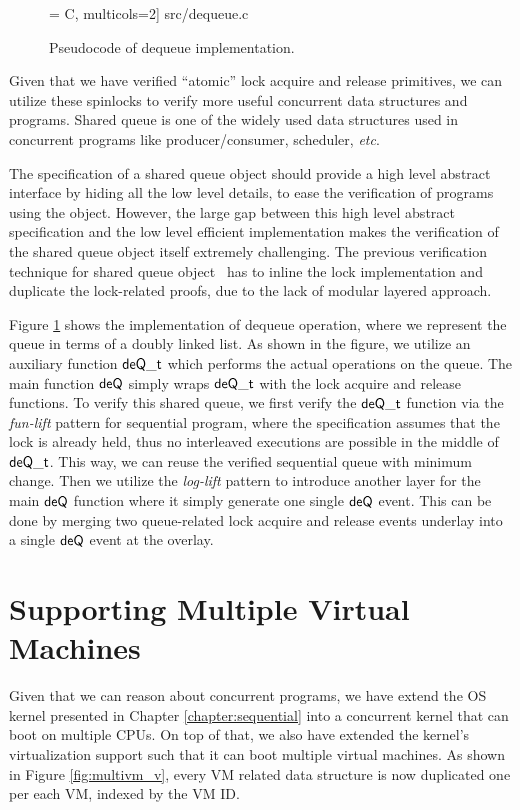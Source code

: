 \begin{figure}[t]
 = C, multicols=2] {src/dequeue.c}
\caption{Pseudocode of dequeue implementation.}
\label{fig:exp:dequeue}
\end{figure}

Given that we have verified ``atomic'' lock acquire and release primitives,
we can utilize these spinlocks to verify more useful concurrent
data structures and programs. Shared queue is one of the widely used
data structures used in concurrent programs like producer/consumer,
scheduler, {\it etc}. 

The specification of a shared queue object should provide a high level abstract
interface by hiding all the low level details,
to ease the verification of programs using the object.
However, the large gap between this high level abstract specification
and the low level efficient implementation makes the verification of the shared queue object
itself extremely challenging.
The previous verification technique for shared queue object~\cite{lili16}
has to inline the lock implementation and duplicate the lock-related proofs, due
to the lack of modular layered approach.

Figure \ref{fig:exp:dequeue} shows the implementation of dequeue operation, where
we represent the queue in terms of a doubly linked list. 
As shown in the figure, we utilize an auxiliary function $\mathsf{deQ}\mathsf{\textcolor{black}{\_t}}$ which
performs the actual operations on the queue. The main function $\mathsf{deQ}$ simply
wraps $\mathsf{deQ}\mathsf{\textcolor{black}{\_t}}$ with the lock acquire and release functions.
To verify this shared queue, we first verify the $\mathsf{deQ}\mathsf{\textcolor{black}{\_t}}$ function
via the  \emph{fun-lift} pattern for sequential program, where the specification
assumes that the lock is already held, thus no interleaved executions are possible
in the middle of $\mathsf{deQ}\mathsf{\textcolor{black}{\_t}}$. 
This way, we can reuse the verified sequential queue with minimum change.
Then we utilize 
the \emph{log-lift} pattern to introduce another layer for the main $\mathsf{deQ}$ function
where it simply generate one single $\mathsf{deQ}$ event. This can be done by merging two
queue-related lock acquire and release events underlay into a single $\mathsf{deQ}$ event
at the overlay. 


\section{Supporting Multiple Virtual Machines}

Given that we can reason about concurrent programs, we have extend the OS kernel
presented in Chapter \ref{chapter:sequential} into a concurrent kernel that can boot on
multiple CPUs.  On top of that, we also have extended the kernel's virtualization support
such that it can boot multiple virtual machines.
As shown in Figure \ref{fig:multivm_v}, every VM related data structure is now duplicated
one per each VM, indexed by the VM ID.

